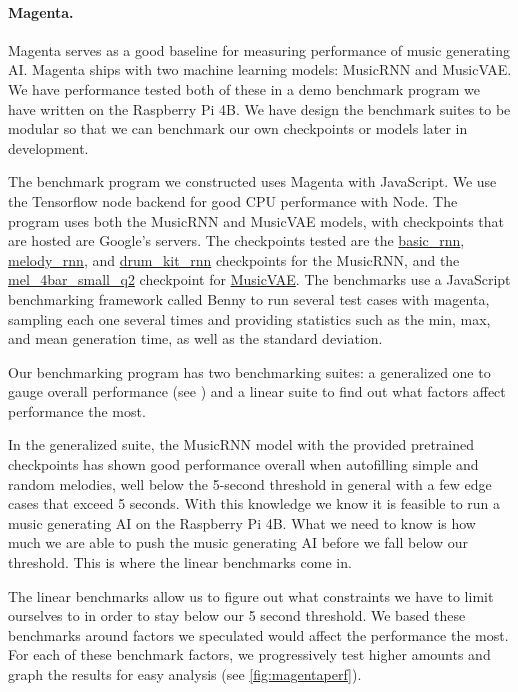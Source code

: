 \paragraph{Magenta.}

Magenta serves as a good baseline for measuring performance of music generating AI.
Magenta ships with two machine learning models: MusicRNN and MusicVAE. We have performance
tested both of these in a demo benchmark program we have written on the Raspberry Pi 4B.
We have design the benchmark suites to be modular so that we can benchmark our own
checkpoints or models later in development.

The benchmark program we constructed uses Magenta with JavaScript. We use the Tensorflow
node backend for good CPU performance with Node. The program uses both the MusicRNN and
MusicVAE models, with checkpoints that are hosted are Google's servers. The checkpoints
tested are the \url{basic_rnn}, \url{melody_rnn}, and \url{drum_kit_rnn} checkpoints for
the MusicRNN, and the \url{mel_4bar_small_q2} checkpoint for \url{MusicVAE}. The benchmarks
use a JavaScript benchmarking framework called Benny to run several test cases with
magenta, sampling each one several times and providing statistics such as the min, max,
and mean generation time, as well as the standard deviation.

Our benchmarking program has two benchmarking suites: a generalized one to gauge overall
performance (see ) and a linear suite to find out what
factors affect performance the most.

In the generalized suite, the MusicRNN model with the provided pretrained checkpoints has
shown good performance overall when autofilling simple and random melodies, well below the
5-second threshold in general with a few edge cases that exceed 5 seconds. With this
knowledge we know it is feasible to run a music generating AI on the Raspberry Pi 4B. What
we need to know is how much we are able to push the music generating AI before we fall
below our threshold. This is where the linear benchmarks come in.

The linear benchmarks allow us to figure out what constraints we have to limit ourselves
to in order to stay below our 5 second threshold. We based these benchmarks around factors
we speculated would affect the performance the most. For each of these benchmark factors,
we progressively test higher amounts and graph the results for easy analysis (see
\autoref{fig:magentaperf}).

